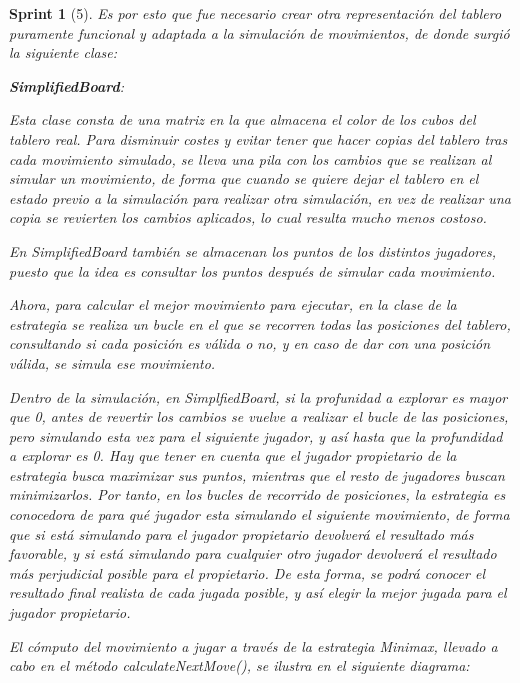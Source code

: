 \documentclass[12pt,a4paper,openright]{book}
\theoremstyle{break}
\newtheorem*{sprint}{Sprint}
\begin{document}
\begin{sprint}[5]
Es por esto que fue necesario crear otra representación del tablero puramente funcional y adaptada a la simulación de movimientos, de donde surgió la siguiente clase:

\textbf{SimplifiedBoard}:

Esta clase consta de una matriz en la que almacena el color de los cubos del tablero real. Para disminuir costes y evitar tener que hacer copias del tablero tras cada movimiento simulado, se lleva una pila con los cambios que se realizan al simular un movimiento, de forma que cuando se quiere dejar el tablero en el estado previo a la simulación para realizar otra simulación, en vez de realizar una copia se revierten los cambios aplicados, lo cual resulta mucho menos costoso.

En SimplifiedBoard también se almacenan los puntos de los distintos jugadores, puesto que la idea es consultar los puntos después de simular cada movimiento.

Ahora, para calcular el mejor movimiento para ejecutar, en la clase de la estrategia se realiza un bucle en el que se recorren todas las posiciones del tablero, consultando si cada posición es válida o no, y en caso de dar con una posición válida, se simula ese movimiento.

Dentro de la simulación, en SimplfiedBoard, si la profunidad a explorar es mayor que 0, antes de revertir los cambios se vuelve a realizar el bucle de las posiciones, pero simulando esta vez para el siguiente jugador, y así hasta que la profundidad a explorar es 0. Hay que tener en cuenta que el jugador propietario de la estrategia busca maximizar sus puntos, mientras que el resto de jugadores buscan minimizarlos. Por tanto, en los bucles de recorrido de posiciones, la estrategia es conocedora de para qué jugador esta simulando el siguiente movimiento, de forma que si está simulando para el jugador propietario devolverá el resultado más favorable, y si está simulando para cualquier otro jugador devolverá el resultado más perjudicial posible para el propietario. De esta forma, se podrá conocer el resultado final realista de cada jugada posible, y así elegir la mejor jugada para el jugador propietario.

El cómputo del movimiento a jugar a través de la estrategia Minimax, llevado a cabo en el método calculateNextMove(), se ilustra en el siguiente diagrama:


\end{sprint}
\end{document}
